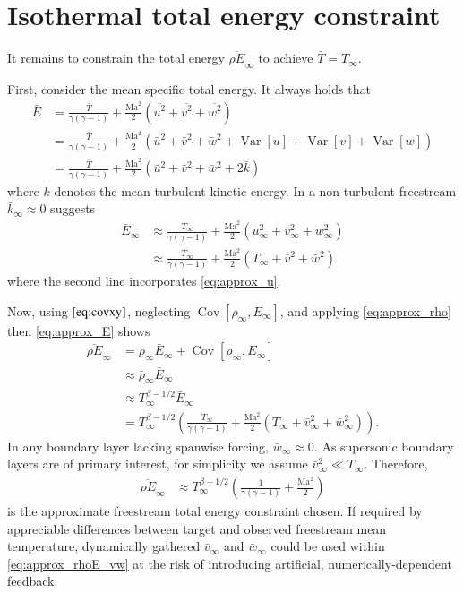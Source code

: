 \documentclass[letterpaper,11pt,nointlimits,reqno]{amsart}
\newcommand{\Mach}[1][]{\mbox{Ma}_{#1}}
\newcommand{\Cov}[2]{\ensuremath{\operatorname{Cov}\left[{#1},{#2}\right]}}
\newcommand{\Var}[1]{\ensuremath{\operatorname{Var}\left[{#1}\right]}}
\begin{document}
\section{Isothermal total energy constraint}

It remains to constrain the total energy $\overline{\rho E}_\infty$ to achieve
$\bar{T}=T_\infty$.

First, consider the mean specific total energy.  It always holds that
\begin{align}
  \bar{E}
  &= \frac{\bar{T}}{\gamma\left( \gamma-1 \right)}
   + \frac{\Mach^2}{2}\left(\overline{u^2}+\overline{v^2}+\overline{w^2}\right)
\\
  &= \frac{\bar{T}}{\gamma\left( \gamma-1 \right)}
   + \frac{\Mach^2}{2}\left(\bar{u}^2+\bar{v}^2+\bar{w}^2
                            +\Var{u} +\Var{v} +\Var{w}\right)
\\
  &= \frac{\bar{T}}{\gamma\left( \gamma-1 \right)}
   + \frac{\Mach^2}{2}\left(\bar{u}^2+\bar{v}^2+\bar{w}^2+2\bar{k}\right)
\end{align}
where $\bar{k}$ denotes the mean turbulent kinetic energy.  In a non-turbulent
freestream $\bar{k}_\infty\approx{}0$ suggests
\begin{align}
  \bar{E}_\infty
  &\approx
     \frac{T_\infty}{\gamma\left(\gamma-1 \right)}
   + \frac{\Mach^2}{2}\left(\bar{u}_\infty^2+\bar{v}_\infty^2+\bar{w}_\infty^2\right)
\\
  \label{eq:approx_E}
  &\approx
     \frac{T_\infty}{\gamma\left(\gamma-1 \right)}
   + \frac{\Mach^2}{2}\left(T_\infty+\bar{v}^2+\bar{w}^2\right)
\end{align}
where the second line incorporates \eqref{eq:approx_u}.

Now, using $\eqref{eq:covxy}$, neglecting $\Cov{\rho_\infty}{E_\infty}$, and
applying \eqref{eq:approx_rho} then \eqref{eq:approx_E} shows
\begin{align}
  \overline{\rho E}_\infty
  &=
  \bar{\rho}_\infty \bar{E}_\infty + \Cov{\rho_\infty}{E_\infty}
\\
  &\approx \bar{\rho}_\infty \bar{E}_\infty
\\
  &\approx T_\infty^{\beta-1/2} \bar{E}_\infty
\\
  \label{eq:approx_rhoE_vw}
  &=
  T_\infty^{\beta-1/2} \left(
      \frac{T_\infty}{\gamma\left( \gamma-1 \right)}
    + \frac{\Mach^2}{2}\left(T_\infty+\bar{v}^2_\infty+\bar{w}^2_\infty\right)
  \right)
.
\end{align}
In any boundary layer lacking spanwise forcing, $\bar{w}_\infty\approx{}0$.  As
supersonic boundary layers are of primary interest, for simplicity we assume
$\bar{v}_\infty^2 \ll T_\infty$.  Therefore,
\begin{align}
  \label{eq:approx_rhoE}
  \overline{\rho E}_\infty
  &\approx
  T_\infty^{\beta+1/2} \left(
      \frac{1}{\gamma\left(\gamma-1\right)}
    + \frac{\Mach^2}{2}
  \right)
\end{align}
is the approximate freestream total energy constraint chosen.  If required by
appreciable differences between target and observed freestream mean
temperature, dynamically gathered $\bar{v}_\infty$ and $\bar{w}_\infty$ could
be used within \eqref{eq:approx_rhoE_vw} at the risk of introducing artificial,
numerically-dependent feedback.
\end{document}
